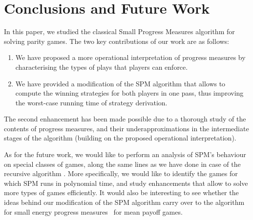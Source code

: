 \documentclass{eptcs}
\begin{document}
\section{Conclusions and Future Work}
In this paper, we studied the classical Small Progress Measures algorithm for solving
parity games.  The two key contributions of our work are as follows:
\begin{enumerate}
 \item We have proposed a more operational interpretation of progress measures by characterising the types of plays that players can enforce. 
 \item We have provided a modification of the SPM algorithm that allows to compute the winning strategies for both players in one pass, thus improving the worst-case running time of strategy derivation.
 \end{enumerate}
The second enhancement has been made possible due to a thorough study of the contents of progress measures, and their underapproximations in the intermediate stages of the algorithm (building on the proposed operational interpretation). \medskip

As for the future work, we would like to perform an analysis of
SPM's behaviour on special classes of games, along the same lines
as we have done in case of the recursive algorithm \cite{GW:13}.
More specifically, we would like to identify the games for which
SPM runs in polynomial time, and study enhancements that allow to
solve more types of games efficiently. It would also be interesting
to see whether the ideas behind our modification of the SPM algorithm
carry over to the algorithm for small energy progress
measures~\cite{BCDGR:11} for mean payoff games.


\end{document}
